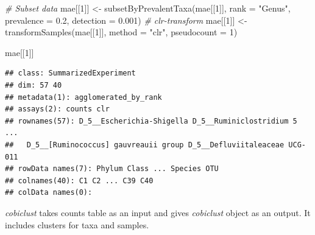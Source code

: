 \documentclass[
]{book}
\newenvironment{Shaded}{\begin{snugshade}}{\end{snugshade}}
\newcommand{\AttributeTok}[1]{\textcolor[rgb]{0.77,0.63,0.00}{#1}}
\newcommand{\CommentTok}[1]{\textcolor[rgb]{0.56,0.35,0.01}{\textit{#1}}}
\newcommand{\DecValTok}[1]{\textcolor[rgb]{0.00,0.00,0.81}{#1}}
\newcommand{\FloatTok}[1]{\textcolor[rgb]{0.00,0.00,0.81}{#1}}
\newcommand{\FunctionTok}[1]{\textcolor[rgb]{0.00,0.00,0.00}{#1}}
\newcommand{\NormalTok}[1]{#1}
\newcommand{\OtherTok}[1]{\textcolor[rgb]{0.56,0.35,0.01}{#1}}
\newcommand{\StringTok}[1]{\textcolor[rgb]{0.31,0.60,0.02}{#1}}
\begin{document}
\begin{Shaded}
\begin{Highlighting}[]
\CommentTok{\# Subset data}
\NormalTok{mae[[}\DecValTok{1}\NormalTok{]] }\OtherTok{\textless{}{-}} \FunctionTok{subsetByPrevalentTaxa}\NormalTok{(mae[[}\DecValTok{1}\NormalTok{]], }\AttributeTok{rank =} \StringTok{"Genus"}\NormalTok{, }\AttributeTok{prevalence =} \FloatTok{0.2}\NormalTok{, }\AttributeTok{detection =} \FloatTok{0.001}\NormalTok{)}
\CommentTok{\# clr{-}transform}
\NormalTok{mae[[}\DecValTok{1}\NormalTok{]] }\OtherTok{\textless{}{-}} \FunctionTok{transformSamples}\NormalTok{(mae[[}\DecValTok{1}\NormalTok{]], }\AttributeTok{method =} \StringTok{"clr"}\NormalTok{, }\AttributeTok{pseudocount =} \DecValTok{1}\NormalTok{)}

\NormalTok{mae[[}\DecValTok{1}\NormalTok{]]}
\end{Highlighting}
\end{Shaded}

\begin{verbatim}
## class: SummarizedExperiment 
## dim: 57 40 
## metadata(1): agglomerated_by_rank
## assays(2): counts clr
## rownames(57): D_5__Escherichia-Shigella D_5__Ruminiclostridium 5 ...
##   D_5__[Ruminococcus] gauvreauii group D_5__Defluviitaleaceae UCG-011
## rowData names(7): Phylum Class ... Species OTU
## colnames(40): C1 C2 ... C39 C40
## colData names(0):
\end{verbatim}

\emph{cobiclust} takes counts table as an input and gives \emph{cobiclust} object as an output.
It includes clusters for taxa and samples.
\end{document}

